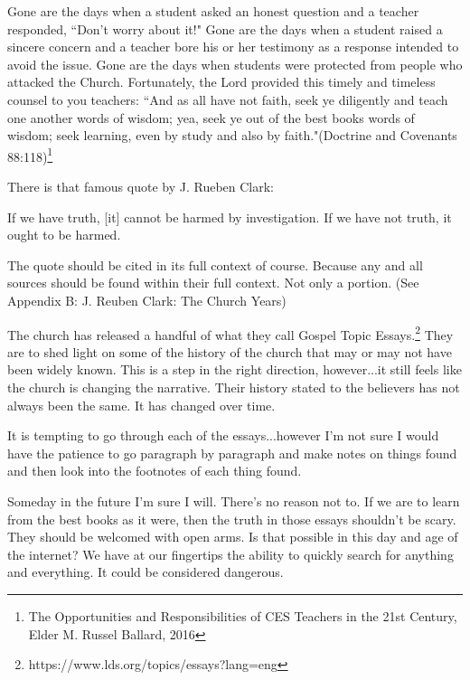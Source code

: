 \documentclass{article}
\begin{document}
\begin{displayquote}
Gone are the days when a student asked an honest question and a teacher 
responded, ``Don’t worry about it!" Gone are the days when a student raised a 
sincere concern and a teacher bore his or her testimony as a response intended 
to avoid the issue. Gone are the days when students were protected from people 
who attacked the Church. Fortunately, the Lord provided this timely and 
timeless counsel to you teachers: ``And as all have not faith, seek ye 
diligently and teach one another words of wisdom; yea, seek ye out of the best 
books words of wisdom; seek learning, even by study and also by 
faith."(Doctrine and Covenants 88:118)\footnote{The Opportunities and 
Responsibilities of CES Teachers in the 21st Century, 
Elder M. Russel Ballard, 2016}
\end{displayquote}

There is that famous quote by J. Rueben Clark:

\begin{displayquote}
If we have truth, [it] cannot be harmed by investigation. 
If we have not truth, it ought to be 
harmed.\cite{clark}
\end{displayquote}

The quote should be cited in its full context of course. Because any and all 
sources should be found within their full context. Not only a portion. 
(See Appendix B: J. Reuben Clark: The Church Years)

The church has released a handful of what they call Gospel Topic 
Essays.\footnote{https://www.lds.org/topics/essays?lang=eng} They are to shed
light on some of the history of the church that may or may not have been
widely known. This is a step in the right direction, however...it still feels
like the church is changing the narrative. Their history stated to the believers
has not always been the same. It has changed over time.

It is tempting to go through each of the essays...however I'm not sure I would
have the patience to go paragraph by paragraph and make notes on things found
and then look into the footnotes of each thing found.

Someday in the future I'm sure I will. There's no reason not to. If we are to
learn from the best books as it were, then the truth in those essays shouldn't
be scary. They should be welcomed with open arms. Is that possible in this day
and age of the internet? We have at our fingertips the ability to quickly search
for anything and everything. It could be considered dangerous.
\end{document}
